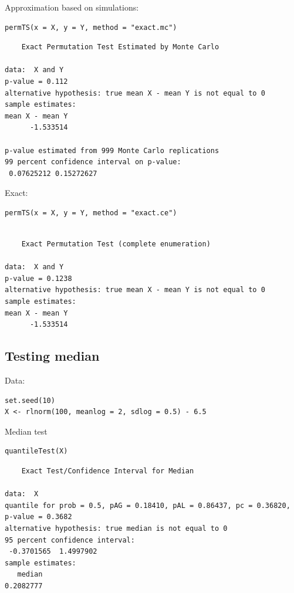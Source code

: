 \documentclass{article}
\begin{document}
Approximation based on simulations:
\lstset{language=r,label= ,caption= ,captionpos=b,numbers=none}
\begin{lstlisting}
permTS(x = X, y = Y, method = "exact.mc")
\end{lstlisting}

\begin{verbatim}
	Exact Permutation Test Estimated by Monte Carlo

data:  X and Y
p-value = 0.112
alternative hypothesis: true mean X - mean Y is not equal to 0
sample estimates:
mean X - mean Y 
      -1.533514 

p-value estimated from 999 Monte Carlo replications
99 percent confidence interval on p-value:
 0.07625212 0.15272627
\end{verbatim}

Exact:
\lstset{language=r,label= ,caption= ,captionpos=b,numbers=none}
\begin{lstlisting}
permTS(x = X, y = Y, method = "exact.ce")
\end{lstlisting}

\begin{verbatim}

	Exact Permutation Test (complete enumeration)

data:  X and Y
p-value = 0.1238
alternative hypothesis: true mean X - mean Y is not equal to 0
sample estimates:
mean X - mean Y 
      -1.533514
\end{verbatim}

\subsection{Testing median}
\label{sec:org1e93d00}

Data:
\lstset{language=r,label= ,caption= ,captionpos=b,numbers=none}
\begin{lstlisting}
set.seed(10)
X <- rlnorm(100, meanlog = 2, sdlog = 0.5) - 6.5
\end{lstlisting}

Median test
\lstset{language=r,label= ,caption= ,captionpos=b,numbers=none}
\begin{lstlisting}
quantileTest(X)
\end{lstlisting}

\begin{verbatim}
	Exact Test/Confidence Interval for Median

data:  X
quantile for prob = 0.5, pAG = 0.18410, pAL = 0.86437, pc = 0.36820, p-value = 0.3682
alternative hypothesis: true median is not equal to 0
95 percent confidence interval:
 -0.3701565  1.4997902
sample estimates:
   median 
0.2082777
\end{verbatim}
\end{document}
